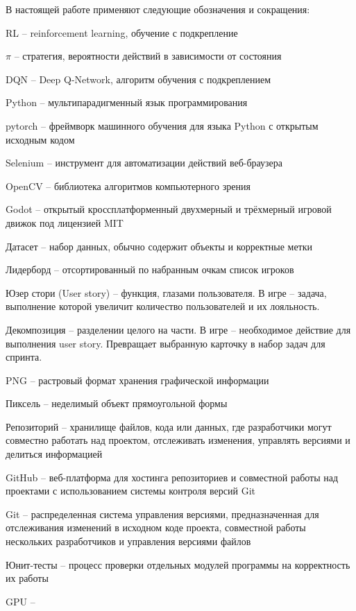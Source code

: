 \documentclass{article}
\begin{document}
В настоящей работе применяют следующие обозначения и сокращения:

RL -- reinforcement learning, обучение с подкрепление

$\pi$ -- стратегия, вероятности действий в зависимости от состояния 

DQN -- Deep Q-Network, алгоритм обучения с подкреплением

Python -- мультипарадигменный язык программирования

pytorch -- фреймворк машинного обучения для языка Python с открытым исходным кодом

Selenium -- инструмент для автоматизации действий веб-браузера

OpenCV -- библиотека алгоритмов компьютерного зрения

Godot -- открытый кроссплатформенный двухмерный и трёхмерный игровой движок под лицензией MIT

Датасет -- набор данных, обычно содержит объекты и корректные метки

Лидерборд -- отсортированный по набранным очкам список игроков

Юзер стори (User story) -- функция, глазами пользователя. В игре -- задача, выполнение которой увеличит количество пользователей и их лояльность.

Декомпозиция -- разделении целого на части. В игре -- необходимое действие для выполнения user story. Превращает выбранную карточку в набор задач для спринта.

PNG -- растровый формат хранения графической информации

Пиксель -- неделимый объект прямоугольной формы

Репозиторий -- хранилище файлов, кода или данных, где разработчики могут совместно работать над проектом, отслеживать изменения, управлять версиями и делиться информацией

GitHub -- веб-платформа для хостинга репозиториев и совместной работы над проектами с использованием системы контроля версий Git

Git -- распределенная система управления версиями, предназначенная для отслеживания изменений в исходном коде проекта, совместной работы нескольких разработчиков и управления версиями файлов

Юнит-тесты -- процесс проверки отдельных модулей программы на корректность их работы

GPU -- 

\newpage

\section*{}
\end{document}
